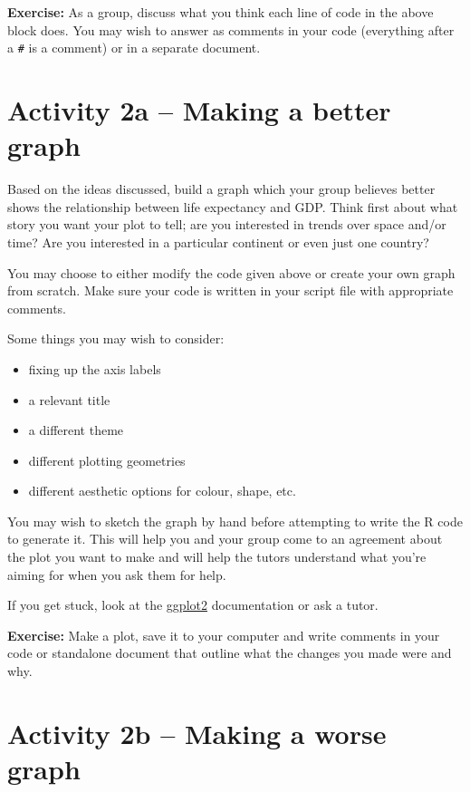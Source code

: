 \documentclass[
]{article}
\providecommand{\tightlist}{%
  \setlength{\itemsep}{0pt}\setlength{\parskip}{0pt}}
\begin{document}
\textbf{Exercise:} As a group, discuss what you think each line of code
in the above block does. You may wish to answer as comments in your code
(everything after a \texttt{\#} is a comment) or in a separate document.

\hypertarget{activity-2a-making-a-better-graph}{%
\section{Activity 2a -- Making a better
graph}\label{activity-2a-making-a-better-graph}}

Based on the ideas discussed, build a graph which your group believes
better shows the relationship between life expectancy and GDP. Think
first about what story you want your plot to tell; are you interested in
trends over space and/or time? Are you interested in a particular
continent or even just one country?

You may choose to either modify the code given above or create your own
graph from scratch. Make sure your code is written in your script file
with appropriate comments.

Some things you may wish to consider:

\begin{itemize}
\tightlist
\item
  fixing up the axis labels
\item
  a relevant title
\item
  a different theme
\item
  different plotting geometries
\item
  different aesthetic options for colour, shape, etc.
\end{itemize}

You may wish to sketch the graph by hand before attempting to write the
R code to generate it. This will help you and your group come to an
agreement about the plot you want to make and will help the tutors
understand what you're aiming for when you ask them for help.

If you get stuck, look at the
\href{https://ggplot2.tidyverse.org/reference/}{ggplot2} documentation
or ask a tutor.

\textbf{Exercise:} Make a plot, save it to your computer and write
comments in your code or standalone document that outline what the
changes you made were and why.

\hypertarget{activity-2b-making-a-worse-graph}{%
\section{Activity 2b -- Making a worse
graph}\label{activity-2b-making-a-worse-graph}}
\end{document}
